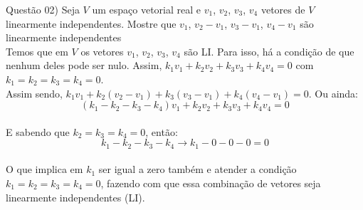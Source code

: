 
\noindent \textcolor{COLOR1}{Questão 02)} Seja $V$ um espaço vetorial real e $v_1$, $v_2$, $v_3$, $v_4$ vetores de $V$ linearmente independentes. Mostre que $v_1$, $v_2-v_1$, $v_3-v_1$, $v_4-v_1$ são linearmente independentes
\\

Temos que em $V$ os vetores $v_1$, $v_2$, $v_3$, $v_4$ são LI. Para isso, há a condição de que nenhum deles pode ser nulo. Assim, $k_1v_1+ k_2v_2 + k_3v_3 + k_4v_4 = 0 $ com $k_1=k_2=k_3=k_4=0$.
\\

Assim sendo, $k_1v_1+k_2(v_2-v_1)+k_3(v_3-v_1) + k_4(v_4-v_1)=0$. Ou ainda:
\\

\[
    (k_1-k_2-k_3-k_4)v_1 + k_2v_2 + k_3v_3 + k_4v_4 = 0
\]
\\

E sabendo que $k_2=k_3=k_4=0$, então:
\\

\[
    k_1-k_2-k_3-k_4\to k_1-0-0-0=0
\]
\\

O que implica em $k_1$ ser igual a zero também e atender a condição $k_1=k_2=k_3=k_4=0$, fazendo com que essa combinação de vetores seja linearmente independentes (LI).\\